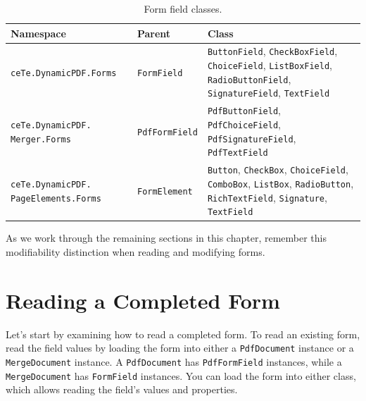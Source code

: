 \documentclass[american,letterpaper]{tufte-book}
\providecommand{\tabularnewline}{\\}
\numberwithin{equation}{section}
\numberwithin{figure}{section}
\begin{document}
{{\begin{table}
\begin{tabular}{>{\raggedright}p{}>{\raggedright}p{}>{\raggedright}p{}}
\toprule 
{\footnotesize Namespace} & {\footnotesize Parent} & {\footnotesize Class}\tabularnewline
\midrule 
{\footnotesize\texttt{ceTe.DynamicPDF.Forms}} & {\footnotesize\texttt{FormField}} & {\footnotesize\texttt{ButtonField}}{\footnotesize , }{\footnotesize\texttt{CheckBoxField}}{\footnotesize ,
}{\footnotesize\texttt{ChoiceField}}{\footnotesize , }{\footnotesize\texttt{ListBoxField}}{\footnotesize ,
}{\footnotesize\texttt{RadioButtonField}}{\footnotesize , }{\footnotesize\texttt{SignatureField}}{\footnotesize ,
}{\footnotesize\texttt{TextField}}\tabularnewline
{\footnotesize\texttt{ceTe.DynamicPDF. Merger.Forms}} & {\footnotesize\texttt{PdfFormField}} & {\footnotesize\texttt{PdfButtonField}}{\footnotesize , }{\footnotesize\texttt{PdfChoiceField}}{\footnotesize ,
}{\footnotesize\texttt{PdfSignatureField}}{\footnotesize , }{\footnotesize\texttt{PdfTextField}}\tabularnewline
{\footnotesize\texttt{ceTe.DynamicPDF. PageElements.Forms}} & {\footnotesize\texttt{FormElement}} & {\footnotesize\texttt{Button}}{\footnotesize , }{\footnotesize\texttt{CheckBox}}{\footnotesize ,
}{\footnotesize\texttt{ChoiceField}}{\footnotesize , }{\footnotesize\texttt{ComboBox}}{\footnotesize ,
}{\footnotesize\texttt{ListBox}}{\footnotesize , }{\footnotesize\texttt{RadioButton}}{\footnotesize ,
}{\footnotesize\texttt{RichTextField}}{\footnotesize , }{\footnotesize\texttt{Signature}}{\footnotesize ,
}{\footnotesize\texttt{TextField}}\tabularnewline
\bottomrule
\end{tabular}\caption{Form field classes.}\label{tab:Form-field-classes.}

\end{table}

As we work through the remaining sections in this chapter, remember
this modifiability distinction when reading and modifying forms.

\section{Reading a Completed Form}

Let's start by examining how to read a completed form. To read an
existing form, read the field values by loading the form into either
a \texttt{PdfDocument} instance or a \texttt{MergeDocument} instance.
A \texttt{PdfDocument} has \texttt{PdfFormField} instances, while
a \texttt{MergeDocument} has \texttt{FormField} instances. You can
load the form into either class, which allows reading the field's
values and properties. 

}}
\end{document}
